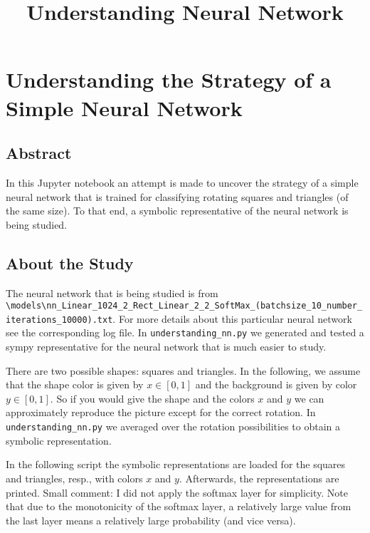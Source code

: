 \documentclass[11pt]{article}
\title{Understanding Neural Network}
\begin{document}
    
    
    \maketitle
    
    

    
    \section{Understanding the Strategy of a Simple Neural
Network}\label{understanding-the-strategy-of-a-simple-neural-network}

\subsection{Abstract}\label{abstract}

In this Jupyter notebook an attempt is made to uncover the strategy of a
simple neural network that is trained for classifying rotating squares
and triangles (of the same size). To that end, a symbolic representative
of the neural network is being studied.

\subsection{About the Study}\label{about-the-study}

The neural network that is being studied is from
\texttt{\textbackslash{}models\textbackslash{}nn\_Linear\_1024\_2\_Rect\_Linear\_2\_2\_SoftMax\_(batchsize\_10\_number\_iterations\_10000).txt}.
For more details about this particular neural network see the
corresponding log file. In \texttt{understanding\_nn.py} we generated
and tested a sympy representative for the neural network that is much
easier to study.

There are two possible shapes: squares and triangles. In the following,
we assume that the shape color is given by \(x \in [0, 1]\) and the
background is given by color \(y \in [0, 1]\). So if you would give the
shape and the colors \(x\) and \(y\) we can approximately reproduce the
picture except for the correct rotation. In
\texttt{understanding\_nn.py} we averaged over the rotation
possibilities to obtain a symbolic representation.

In the following script the symbolic representations are loaded for the
squares and triangles, resp., with colors \(x\) and \(y\). Afterwards,
the representations are printed. Small comment: I did not apply the
softmax layer for simplicity. Note that due to the monotonicity of the
softmax layer, a relatively large value from the last layer means a
relatively large probability (and vice versa).
\end{document}
